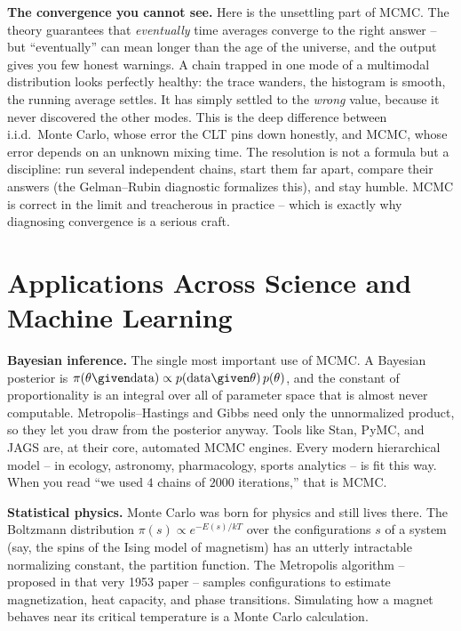 \begin{paradoxbox}
\textbf{The convergence you cannot see.} Here is the unsettling part of MCMC.
The theory guarantees that \emph{eventually} time averages converge to the right
answer -- but ``eventually'' can mean longer than the age of the universe, and the
output gives you few honest warnings. A chain trapped in one mode of a multimodal
distribution looks perfectly healthy: the trace wanders, the histogram is smooth,
the running average settles. It has simply settled to the \emph{wrong} value,
because it never discovered the other modes. This is the deep difference between
i.i.d.\ Monte Carlo, whose error the CLT pins down honestly, and MCMC, whose
error depends on an unknown mixing time. The resolution is not a formula but a
discipline: run several independent chains, start them far apart, compare their
answers (the Gelman--Rubin diagnostic formalizes this), and stay humble. MCMC is
correct in the limit and treacherous in practice -- which is exactly why
diagnosing convergence is a serious craft.
\end{paradoxbox}

\section{Applications Across Science and Machine Learning}
\label{ch35:applications}

\begin{applicationbox}
\textbf{Bayesian inference.} The single most important use of MCMC. A Bayesian
posterior is
$\pi(\theta \given \text{data}) \propto p(\text{data}\given\theta)\,p(\theta)$,
and the constant of proportionality is an integral over all of parameter space
that is almost never computable. Metropolis--Hastings and Gibbs need only the
unnormalized product, so they let you draw from the posterior anyway. Tools like
Stan, PyMC, and JAGS are, at their core, automated MCMC engines. Every modern
hierarchical model -- in ecology, astronomy, pharmacology, sports analytics -- is
fit this way. When you read ``we used $4$ chains of $2000$ iterations,'' that is
MCMC.
\end{applicationbox}

\begin{applicationbox}
\textbf{Statistical physics.} Monte Carlo was born for physics and still lives
there. The Boltzmann distribution $\pi(s) \propto e^{-E(s)/kT}$ over the
configurations $s$ of a system (say, the spins of the Ising model of magnetism)
has an utterly intractable normalizing constant, the partition function. The
Metropolis algorithm -- proposed in that very 1953 paper -- samples
configurations to estimate magnetization, heat capacity, and phase transitions.
Simulating how a magnet behaves near its critical temperature is a Monte Carlo
calculation.
\end{applicationbox}

